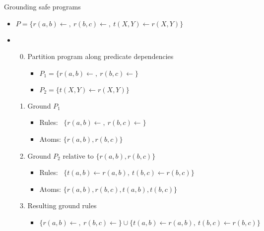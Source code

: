 \begin{frame}{Grounding safe programs}
  \begin{itemize}
  \item<1-> \(
    P = \{ r(a,b)\leftarrow{}, \ r(b,c)\leftarrow{}, \ t(X,Y) \leftarrow r(X,Y) \}
    \)
    \medskip
  \item <2-> 
    \smallskip
    \begin{enumerate}\setcounter{enumi}{-1}
    \item <3-> Partition program along predicate dependencies
      \begin{itemize}\small
      \item \( P_1 = \{ r(a,b)\leftarrow{}, \ r(b,c)\leftarrow{} \} \)
      \item \( P_2 = \{ t(X,Y) \leftarrow r(X,Y) \} \)
      \end{itemize}
      \smallskip
    \item <4-> Ground $P_1$
      \begin{itemize}\small
      \item Rules: \ $\{ r(a,b)\leftarrow{}, \ r(b,c)\leftarrow{} \}$
      \item Atoms:   $\{ r(a,b), r(b,c) \}$
      \end{itemize}
      \smallskip
    \item<5-> Ground $P_2$ relative to $\{ r(a,b), r(b,c) \}$
      \begin{itemize}\small
      \item Rules: \ $\{ t(a,b) \leftarrow r(a,b),\ t(b,c) \leftarrow r(b,c) \}$
      \item Atoms:   $\{ r(a,b), r(b,c), t(a,b), t(b,c) \}$
      \end{itemize}
      \smallskip
    \item<6-> Resulting ground rules
      \begin{itemize}\small
      \item  $\{ r(a,b)\leftarrow{}, \ r(b,c)\leftarrow{} \}\cup \{ t(a,b) \leftarrow r(a,b),\ t(b,c) \leftarrow r(b,c) \}$
      \end{itemize}
    \end{enumerate}
  \end{itemize}
\end{frame}
%
